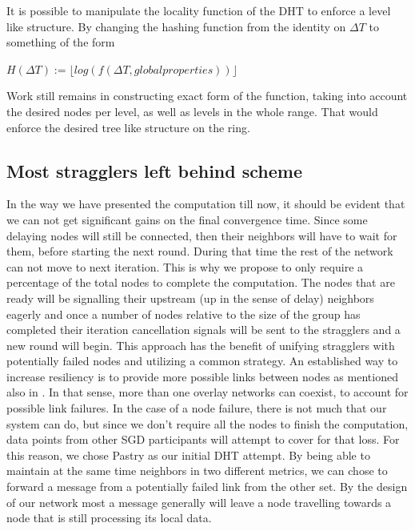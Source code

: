 \documentclass[12pt,notitlepage]{article}
\newcommand{\mfloor}[1]{\lfloor #1 \rfloor}
\begin{document}
It is possible to manipulate the locality function of the DHT to enforce a
level like structure. By changing the hashing function  from the identity on
 $\Delta T$ to something of the form
\begin{center}
\begin{math}
H(\Delta T) := \mfloor{log(f(\Delta T, global properties))}
\end{math}
\end{center}
Work still remains in constructing exact form of the function, taking into account the
desired nodes per level, as well as levels in the whole range.
That would enforce the desired tree like structure on the ring.

\subsection{Most stragglers left behind scheme}
In the way we have presented the computation till now, it should be evident that
we can not get significant gains on the final convergence time. Since some delaying
nodes will still be connected, then their neighbors will have to wait for them, before starting
the next round. During that time the rest of the network can not move to next iteration.
This is why we propose to only require a percentage of the total nodes to complete the computation.
The nodes that are ready will be signalling their upstream (up in the sense of delay) neighbors eagerly
and once a number of nodes relative to the size of the group has completed their iteration cancellation signals
will be sent to the stragglers and a new round will begin. This approach has the benefit of unifying stragglers
with potentially failed nodes and utilizing a common strategy.
An established way to increase resiliency is to provide more possible links between nodes as mentioned also in \cite{fat-trees-fault}.
In that sense, more than one overlay networks can coexist, to account for possible link failures. In the case of a node failure,
there is not much that our system can do, but since we don't require all the nodes to finish the computation, data points from other SGD
participants will attempt to cover for that loss. For this reason, we chose Pastry as our initial DHT attempt. By being able to maintain
at the same time neighbors in two different metrics, we can chose to forward a message from a potentially failed link from the other set.
By the design of our network most a message generally will leave a node travelling towards a node that is still processing its local data.
\end{document}

